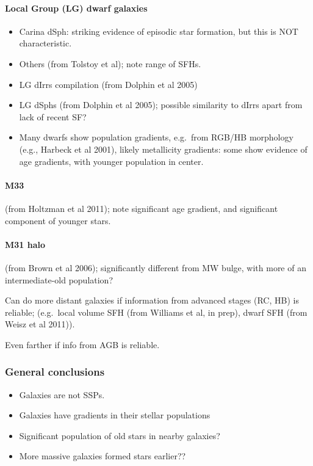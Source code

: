 \documentclass{article}
\begin{document}
\paragraph{Local Group (LG) dwarf galaxies}
\begin{itemize}
    \item Carina dSph: striking evidence of episodic star formation, but this is NOT characteristic.  \item Others (from Tolstoy et al); note range of SFHs.
    \item LG dIrrs compilation (from Dolphin et al 2005)
    \item LG dSphs (from Dolphin et al 2005); possible similarity to dIrrs
        apart from lack of recent SF?
    \item Many dwarfs show population gradients, e.g.\ from RGB/HB morphology
        (e.g., Harbeck et al 2001), likely metallicity gradients: some show
        evidence of age gradients, with younger population in center.
\end{itemize}

\paragraph{M33}
(from Holtzman et al 2011); note significant age
gradient, and significant component of younger stars.
\paragraph{M31 halo}
(from Brown et al 2006); significantly different from
MW bulge, with more of an intermediate-old population?

Can do more distant galaxies if information from advanced stages (RC, HB) is
reliable; (e.g.\ local volume SFH (from Williams et al, in prep), dwarf SFH
(from Weisz et al 2011)).

Even farther if info from AGB is reliable.

\subsubsection{General conclusions}
\begin{itemize}
    \item Galaxies are not SSPs.
    \item Galaxies have gradients in their stellar populations
    \item Significant population of old stars in nearby galaxies?
    \item More massive galaxies formed stars earlier??
\end{itemize}
\end{document}
